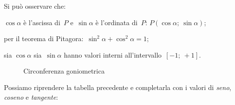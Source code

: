 
Si può osservare che:

\begin{itemize*}
 \item $\cos \alpha$ è l'ascissa di~$P$ e~$\sin \alpha$ è 
  l'ordinata di~$P$: $P \left(\cos \alpha;~\sin \alpha \right)$;
 \item per il teorema di Pitagora:~$\sin^2 \alpha + \cos^2 \alpha = 1$;
 \item sia $\cos \alpha$ sia~$\sin \alpha$ hanno valori interni
  all'intervallo~$\left[-1;~+1 \right]$.
\end{itemize*}


\begin{figure}[h] 
 \vspace{-6pt}
  \begin{center}
\begin{inaccessibleblock}
    
    \caption{Circonferenza goniometrica}
    \label{fig:trigo_circ_gonio}
\end{inaccessibleblock}
  \end{center}
   \vspace{-24pt}
\end{figure} 

Possiamo riprendere la tabella precedente e completarla con i valori di 
\emph{seno}, \emph{coseno} e \emph{tangente}:

